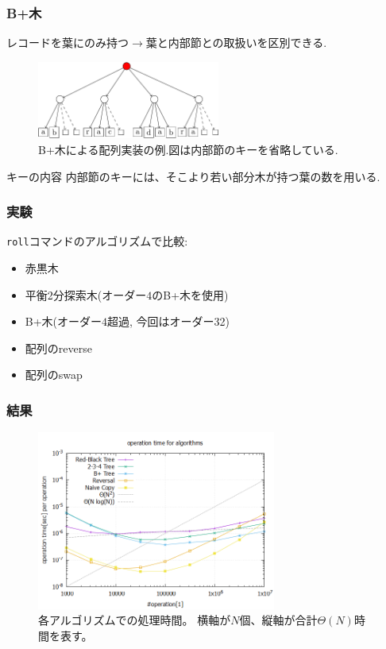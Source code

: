 \documentclass[10pt]{beamer}
\begin{document}
\begin{frame}
    \frametitle{B+木}

    レコードを葉にのみ持つ$\longrightarrow$葉と内部節との取扱いを区別できる.
    \begin{figure}
        \includegraphics[width=6cm]{abracadabra.png}
        \caption{B+木による配列実装の例.図は内部節のキーを省略している.}
    \end{figure}

    \begin{alertblock}{キーの内容}
        内部節のキーには、そこより若い部分木が持つ葉の数を用いる.
    \end{alertblock}

\end{frame}
\begin{frame}
    \frametitle{実験}

    \texttt{roll}コマンドのアルゴリズムで比較:
    \begin{itemize}
        \item 赤黒木
        \item 平衡2分探索木(オーダー$4$のB+木を使用)
        \item B+木(オーダー$4$超過, 今回はオーダー32)
        \item 配列のreverse
        \item 配列のswap
    \end{itemize}
\end{frame}
\begin{frame}
    \frametitle{結果}

    \begin{figure}
        \centering
        \includegraphics[width=0.7\textwidth]{algorithm.png}
        \caption{各アルゴリズムでの処理時間。
            横軸が$N$個、縦軸が合計$\Theta(N)$時間を表す。}
    \end{figure}

\end{frame}
\end{document}

